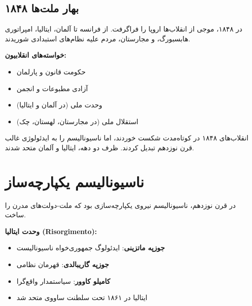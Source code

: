 \begin{center}
\end{center}

\subsection{بهار ملت‌ها ۱۸۴۸}


در ۱۸۴۸، موجی از انقلاب‌ها اروپا را فراگرفت. از فرانسه تا آلمان، ایتالیا، امپراتوری هابسبورگ، و مجارستان، مردم علیه نظام‌های استبدادی شوریدند.

\textbf{خواسته‌های انقلابیون:}
\begin{itemize}
    \item حکومت قانون و پارلمان
    \item آزادی مطبوعات و انجمن
    \item وحدت ملی (در آلمان و ایتالیا)
    \item استقلال ملی (در مجارستان، لهستان، چک)
\end{itemize}

انقلاب‌های ۱۸۴۸ در کوتاه‌مدت شکست خوردند، اما ناسیونالیسم را به ایدئولوژی غالب قرن نوزدهم تبدیل کردند. ظرف دو دهه، ایتالیا و آلمان متحد شدند.


\section{ناسیونالیسم یکپارچه‌ساز}


در قرن نوزدهم، ناسیونالیسم نیروی یکپارچه‌سازی بود که ملت-دولت‌های مدرن را ساخت.

\textbf{وحدت ایتالیا (Risorgimento):}
\begin{itemize}
    \item \textbf{جوزپه ماتزینی}: ایدئولوگ جمهوری‌خواه ناسیونالیست
    \item \textbf{جوزپه گاریبالدی}: قهرمان نظامی
    \item \textbf{کامیلو کاوور}: سیاستمدار واقع‌گرا
    \item ایتالیا در ۱۸۶۱ تحت سلطنت ساووی متحد شد
\end{itemize}

